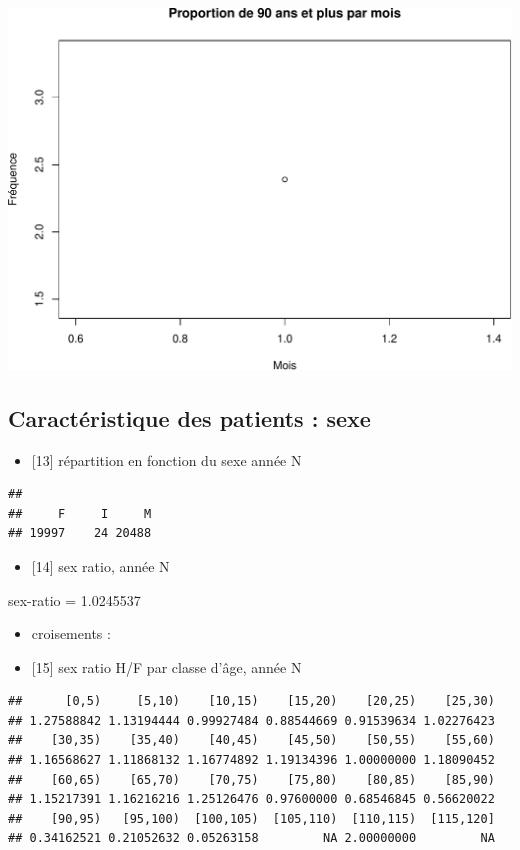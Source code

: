 \documentclass[]{article}
\begin{document}
\includegraphics{rapport_2014_files/figure-latex/age_extreme-4.pdf}

\subsection{Caractéristique des patients :
sexe}\label{caracteristique-des-patients-sexe}

\begin{itemize}
\itemsep1pt\parskip0pt
\item
  {[}13{]} répartition en fonction du sexe année N
\end{itemize}

\begin{verbatim}
## 
##     F     I     M 
## 19997    24 20488
\end{verbatim}

\begin{itemize}
\itemsep1pt\parskip0pt
\item
  {[}14{]} sex ratio, année N
\end{itemize}

sex-ratio = 1.0245537

\begin{itemize}
\item
  croisements :
\item
  {[}15{]} sex ratio H/F par classe d'âge, année N
\end{itemize}

\begin{verbatim}
##      [0,5)     [5,10)    [10,15)    [15,20)    [20,25)    [25,30) 
## 1.27588842 1.13194444 0.99927484 0.88544669 0.91539634 1.02276423 
##    [30,35)    [35,40)    [40,45)    [45,50)    [50,55)    [55,60) 
## 1.16568627 1.11868132 1.16774892 1.19134396 1.00000000 1.18090452 
##    [60,65)    [65,70)    [70,75)    [75,80)    [80,85)    [85,90) 
## 1.15217391 1.16216216 1.25126476 0.97600000 0.68546845 0.56620022 
##    [90,95)   [95,100)  [100,105)  [105,110)  [110,115)  [115,120] 
## 0.34162521 0.21052632 0.05263158         NA 2.00000000         NA
\end{verbatim}
\end{document}
